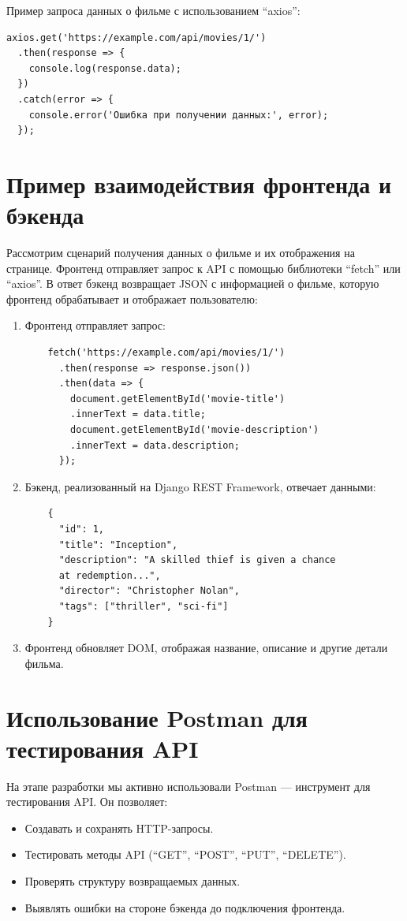 Пример запроса данных о фильме с использованием ``axios'':
\begin{verbatim}
axios.get('https://example.com/api/movies/1/')
  .then(response => {
    console.log(response.data);
  })
  .catch(error => {
    console.error('Ошибка при получении данных:', error);
  });
\end{verbatim}

\section{Пример взаимодействия фронтенда и бэкенда}
Рассмотрим сценарий получения данных о фильме и их отображения на странице. Фронтенд отправляет запрос к API с помощью библиотеки ``fetch'' или ``axios''. В ответ бэкенд возвращает JSON с информацией о фильме, которую фронтенд обрабатывает и отображает пользователю:
\begin{enumerate}
    \item Фронтенд отправляет запрос:
    \begin{verbatim}
    fetch('https://example.com/api/movies/1/')
      .then(response => response.json())
      .then(data => {
        document.getElementById('movie-title')
        .innerText = data.title;
        document.getElementById('movie-description')
        .innerText = data.description;
      });
    \end{verbatim}
    \item Бэкенд, реализованный на Django REST Framework, отвечает данными:
    \begin{verbatim}
    {
      "id": 1,
      "title": "Inception",
      "description": "A skilled thief is given a chance 
      at redemption...",
      "director": "Christopher Nolan",
      "tags": ["thriller", "sci-fi"]
    }
    \end{verbatim}
    \item Фронтенд обновляет DOM, отображая название, описание и другие детали фильма.
\end{enumerate}

\section{Использование Postman для тестирования API}
На этапе разработки мы активно использовали Postman — инструмент для тестирования API. Он позволяет:
\begin{itemize}
    \item Создавать и сохранять HTTP-запросы.
    \item Тестировать методы API (``GET'', ``POST'', ``PUT'', ``DELETE'').
    \item Проверять структуру возвращаемых данных.
    \item Выявлять ошибки на стороне бэкенда до подключения фронтенда.
\end{itemize}

